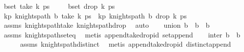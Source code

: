 \begin{isabellebody}
\ {\isacharquery}{\kern0pt}bset\ {\isacharparenleft}{\kern0pt}take\ k\ ps{\isacharparenright}{\kern0pt}{\isachardoublequoteclose}\ \isanewline
\ \ \isamarkupfalse%
\ {\isacharquery}{\kern0pt}bset\ {\isacharparenleft}{\kern0pt}drop\ k\ ps{\isacharparenright}{\kern0pt}{\isachardoublequoteclose}\isanewline
\ \ \isamarkupfalse%
\ kp{}{\isacharcolon}{\kern0pt}\ {\isachardoublequoteopen}knights{\isacharunderscore}{\kern0pt}path\ {\isacharquery}{\kern0pt}b\ {\isacharparenleft}{\kern0pt}take\ k\ ps{\isacharparenright}{\kern0pt}{\isachardoublequoteclose}\ \ kp{}{\isacharcolon}{\kern0pt}\ {\isachardoublequoteopen}knights{\isacharunderscore}{\kern0pt}path\ {\isacharquery}{\kern0pt}b\ {\isacharparenleft}{\kern0pt}drop\ k\ ps{\isacharparenright}{\kern0pt}{\isachardoublequoteclose}\isanewline
\ \ \ \ \isamarkupfalse%
\ assms\ knights{\isacharunderscore}{\kern0pt}path{\isacharunderscore}{\kern0pt}take\ knights{\isacharunderscore}{\kern0pt}path{\isacharunderscore}{\kern0pt}drop\ \isamarkupfalse%
\ auto\isanewline
\ \ \isamarkupfalse%
\ union{\isacharcolon}{\kern0pt}\ {\isachardoublequoteopen}{\isacharquery}{\kern0pt}b\ {\isasymunion}\ {\isacharquery}{\kern0pt}b\ {\isacharequal}{\kern0pt}\ b{\isachardoublequoteclose}\isanewline
\ \ \ \ \isamarkupfalse%
\ assms\ knights{\isacharunderscore}{\kern0pt}path{\isacharunderscore}{\kern0pt}set{\isacharunderscore}{\kern0pt}eq\ \isamarkupfalse%
\ {\isacharparenleft}{\kern0pt}metis\ append{\isacharunderscore}{\kern0pt}take{\isacharunderscore}{\kern0pt}drop{\isacharunderscore}{\kern0pt}id\ set{\isacharunderscore}{\kern0pt}append{\isacharparenright}{\kern0pt}\isanewline
\ \ \isamarkupfalse%
\ inter{\isacharcolon}{\kern0pt}\ {\isachardoublequoteopen}{\isacharquery}{\kern0pt}b\ {\isasyminter}\ {\isacharquery}{\kern0pt}b\ {\isacharequal}{\kern0pt}\ {\isacharbraceleft}{\kern0pt}{\isacharbraceright}{\kern0pt}{\isachardoublequoteclose}\isanewline
\ \ \ \ \isamarkupfalse%
\ assms\ knights{\isacharunderscore}{\kern0pt}path{\isacharunderscore}{\kern0pt}distinct\ \isamarkupfalse%
\ {\isacharparenleft}{\kern0pt}metis\ append{\isacharunderscore}{\kern0pt}take{\isacharunderscore}{\kern0pt}drop{\isacharunderscore}{\kern0pt}id\ distinct{\isacharunderscore}{\kern0pt}append{\isacharparenright}{\kern0pt}\isanewline

\end{isabellebody}
